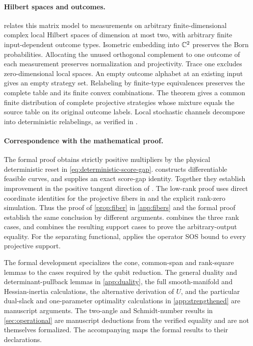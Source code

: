 \paragraph{Hilbert spaces and outcomes.}
 relates this matrix model to
measurements on arbitrary finite-dimensional complex local Hilbert spaces
of dimension at most two, with arbitrary finite input-dependent outcome
types. Isometric embedding into \(\mathbb C^2\) preserves the Born probabilities.
Allocating the unused orthogonal complement to one outcome of each
measurement preserves normalization and projectivity. Trace one excludes
zero-dimensional local spaces. An empty outcome alphabet at an existing
input gives an empty strategy set. Relabeling by finite-type equivalences
preserves the complete table and its finite convex combinations.
The theorem
gives a common finite distribution of complete projective strategies
whose mixture equals the source table on its original outcome labels.
Local stochastic channels decompose into deterministic relabelings, as
verified in .

\paragraph{Correspondence with the mathematical proof.}
The formal proof obtains strictly positive multipliers by the physical
deterministic reset in \eqref{eq:deterministic-score-gap}.
 constructs differentiable feasible curves,
and  supplies an exact score-gap identity.
Together they establish improvement in the positive tangent direction of
. The low-rank proof uses direct
coordinate identities for the projective fibers in
 and the explicit rank-zero simulation.
Thus the proof of \cref{prop:fiber} in \cref{app:fibers} and the
formal proof establish the same conclusion by different arguments.
 combines the three rank cases, and
 combines the resulting support cases to prove the
arbitrary-output equality. For the separating functional,
 applies the operator SOS bound to
every projective support.

The formal development specializes the cone, common-span and rank-square
lemmas to the cases required by the qubit reduction. The general duality and determinant-pullback
lemmas in \cref{app:duality}, the full smooth-manifold and Hessian-inertia
calculations, the alternative derivation of \(U\), and the
particular dual-slack and one-parameter optimality calculations in
\cref{app:strengthened} are manuscript arguments.
The two-angle and Schmidt-number results in \cref{sec:operational} are
manuscript deductions from the verified equality and are not themselves
formalized. The accompanying
 maps the formal results to
their declarations.

